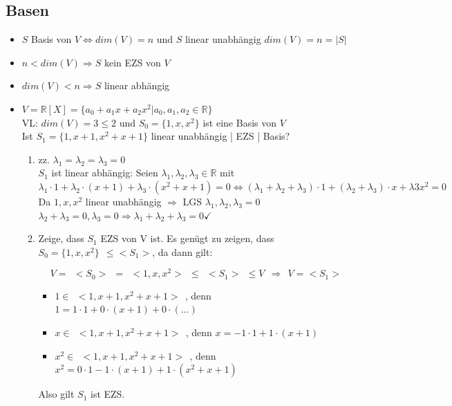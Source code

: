 \documentclass{scrartcl}
\begin{document}
\subsection{Basen}

\begin{itemize}
\item $S$ Basis von $V \Leftrightarrow dim(V) = n$ und $S$ linear unabhängig  $ dim(V) = n = |S|$
\item $n < dim(V) \Rightarrow S $ kein EZS von $V$
\item $dim (V) < n \Rightarrow S $ linear abhängig
\end{itemize}

\begin{Beispiel}
\begin{itemize}
    \item %
		$V= \mathbb{R} [X] = \{a_0 + a_1x + a_2x^2 | a_0, a_1, a_2 \in \mathbb{R}\} $\\
		VL: $dim(V) = 3 \leq 2$ und $ S_0 = \{ 1, x, x^2\}$ ist eine Basis von $V$\\
		Ist $ S_1 = \{ 1, x + 1, x^2 + x + 1\}$ linear unabhängig | EZS | Basis?
		\begin{enumerate}[label={(\arabic*)}]
			\item %
			zz. $\lambda_1 = \lambda_2 =  \lambda_3 = 0$\\
			$S_1$ ist linear abhängig: Seien $\lambda_1, \lambda_2, \lambda_3 \in \mathbb{R}$ mit $\lambda_1 \cdot 1 + \lambda_2 \cdot (x+1) + \lambda_3 \cdot (x^2 + x + 1) = 0 \Leftrightarrow (\lambda_1 + \lambda_2 +  \lambda_3) \cdot 1 + ( \lambda_2 +  \lambda_3) \cdot x + \lambda3x^2 = 0 $\\
			Da $1,x,x^2$ linear unabhängig $\Rightarrow$ LGS $\lambda_1, \lambda_2, \lambda_3 = 0 $\\
			$ \lambda_2 + \lambda_3 = 0, \lambda_3 = 0 \Rightarrow \lambda_1 + \lambda_2 + \lambda_3 = 0 \checkmark$ 
			
			\item %
			Zeige, dass $S_1$ EZS von V ist. Es genügt zu zeigen, dass $S_0=\{1,x,x^2\} ~~\leq <S_1>$, da dann gilt:
			
			\[V = ~~ <S_0> ~~ = ~~ <1, x,x^2> ~~ \leq ~~ <S_1> ~~ \leq V ~~ \Rightarrow ~~ V = <S_1>\]
			
			\begin{itemize}
			\item $ 1 \in ~~ < 1, x + 1, x^2 + x + 1> ~~$, denn $1 = 1 \cdot 1 + 0 \cdot (x+1) + 0 \cdot (\dots)$ 
			\item $ x \in ~~ < 1, x + 1, x^2 + x + 1> ~~$, denn $x = -1 \cdot 1 + 1 \cdot (x+1)$ 
			\item $ x^2 \in ~~ < 1, x + 1, x^2 + x + 1> ~~$, denn $x^2 = 0 \cdot 1 - 1 \cdot (x+1) + 1 \cdot (x^2 + x + 1)$ 
			\end{itemize}
			Also gilt $S_1$ ist EZS.
			

\end{enumerate}
\end{itemize}
\end{Beispiel}
\end{document}
